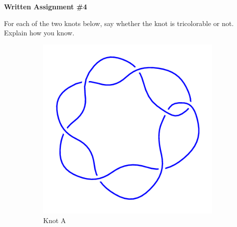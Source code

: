 \documentclass[12pt,letterpaper]{article}
\begin{document}
\setlength{\parskip}{1ex plus 0.5ex minus 0.2ex}
\setlength{\parindent}{0pt}

\pagestyle{fancy}
\lfoot{}
\rfoot{}

\begin{center}
{
\Large
\textbf{Written Assignment \#4}
}
\end{center}

For each of the two knots below, say whether the knot is tricolorable or not. Explain how you know.

\begin{figure}[h]
    \centering
    \begin{subfigure}{.45\textwidth}
        \centering
        \includegraphics[width=\textwidth]{knotpics/7_2.png}
        \caption{Knot A}
    \end{subfigure}
    \qquad
    \begin{subfigure}{.45\textwidth}
        \centering

\end{subfigure}
\end{figure}
\end{document}
